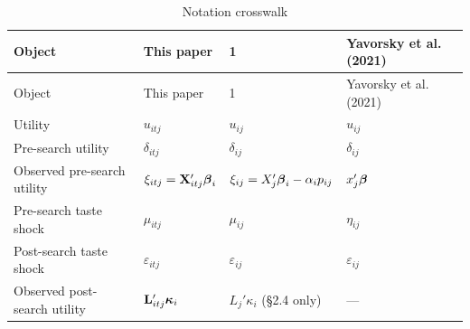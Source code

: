 \documentclass[
  letterpaper,
  DIV=11,
  numbers=noendperiod]{scrartcl}
\begin{document}
\begin{longtable}[]{@{}
  >{\raggedright\arraybackslash}p{}
  >{\raggedright\arraybackslash}p{}
  >{\raggedright\arraybackslash}p{}
  >{\raggedright\arraybackslash}p{}@{}}
\caption{Notation crosswalk}\label{tbl-notation}\tabularnewline
\toprule\noalign{}
\begin{minipage}[b]{\linewidth}\raggedright
Object
\end{minipage} & \begin{minipage}[b]{\linewidth}\raggedright
This paper
\end{minipage} & \begin{minipage}[b]{\linewidth}\raggedright
1
\end{minipage} & \begin{minipage}[b]{\linewidth}\raggedright
Yavorsky et al. (2021)
\end{minipage} \\
\midrule\noalign{}
\endfirsthead
\toprule\noalign{}
\begin{minipage}[b]{\linewidth}\raggedright
Object
\end{minipage} & \begin{minipage}[b]{\linewidth}\raggedright
This paper
\end{minipage} & \begin{minipage}[b]{\linewidth}\raggedright
1
\end{minipage} & \begin{minipage}[b]{\linewidth}\raggedright
Yavorsky et al. (2021)
\end{minipage} \\
\midrule\noalign{}
\endhead
\bottomrule\noalign{}
\endlastfoot
Utility & \(u_{itj}\) & \(u_{ij}\) & \(u_{ij}\) \\
Pre-search utility & \(\delta_{itj}\) & \(\delta_{ij}\) &
\(\delta_{ij}\) \\
Observed pre-search utility & \(\xi_{itj} = \mathbf{X}_{itj}'\boldsymbol{\beta}_i\) &
\(\xi_{ij} = X_j'\boldsymbol{\beta}_i - \alpha_i p_{ij}\) & \(x_j'\boldsymbol{\beta}\) \\
Pre-search taste shock & \(\mu_{itj}\) & \(\mu_{ij}\) & \(\eta_{ij}\) \\
Post-search taste shock & \(\varepsilon_{itj}\) & \(\varepsilon_{ij}\) &
\(\varepsilon_{ij}\) \\
Observed post-search utility & \(\mathbf{L}_{itj}'\boldsymbol{\kappa}_i\) &
\(L_j'\kappa_i\) (§2.4 only) & --- \\

\end{longtable}
\end{document}
